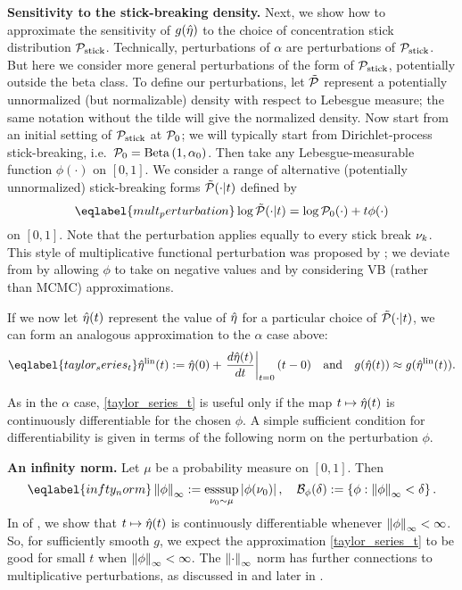 \noindent \textbf{Sensitivity to the stick-breaking density.} Next, we show how
to approximate the sensitivity of $g(\hat\eta)$ to the choice of concentration
stick distribution $\mathcal{P}_{\mathrm{stick}}$. Technically, perturbations of $\alpha$ are
perturbations of $\mathcal{P}_{\mathrm{stick}}$. But here we consider more general perturbations of
the form of $\mathcal{P}_{\mathrm{stick}}$, potentially outside the beta class. To define our
perturbations, let $\tilde{\mathcal{P}}$ represent a potentially unnormalized (but
normalizable) density with respect to Lebesgue measure; the same notation
without the tilde will give the normalized density. Now start from an initial
setting of $\mathcal{P}_{\mathrm{stick}}$ at $\mathcal{P}_{0}$; we will typically start from Dirichlet-process
stick-breaking, i.e.\ $\mathcal{P}_{0} = \mathrm{Beta}\left(1,\alpha_0\right)$. Then take any
Lebesgue-measurable function $\phi(\cdot)$ on $[0,1]$. We consider a range of
alternative (potentially unnormalized) stick-breaking forms $\tilde{\mathcal{P}}(\cdot \vert
t)$ defined by
%
\begin{equation} \eqlabel{mult_perturbation}
	\log \ptil(\cdot \vert \t) = \log \pbase(\cdot) + \t \phi(\cdot)
\end{equation}
%
on $[0,1]$. Note that the perturbation applies equally to every stick break
$\nu_{k}$. This style of multiplicative functional perturbation was proposed by
\citet{gustafson:1996:local}; we deviate from \citet{gustafson:1996:local} by
allowing $\phi$ to take on negative values and by considering VB (rather than
MCMC) approximations.

If we now let $\hat\eta(t)$ represent the value of $\hat\eta$ for a particular
choice of $\tilde{\mathcal{P}}(\cdot \vert t)$, we can form an analogous approximation to the
$\alpha$ case above:
%
\begin{align} \eqlabel{taylor_series_t}
%
\etalin(\t) :=
    \etaopt(0) +
    \fracat{d\etaopt(t)}{dt}{\t=0} (\t - 0)
\mathand
g(\etaopt(\t)) \approx g(\etalin(\t)).
%
\end{align}

As in the $\alpha$ case, \eqref{taylor_series_t} is useful only if the map $t
\mapsto \hat\eta(t)$ is continuously differentiable for the chosen $\phi$. A
simple sufficient condition for differentiability is given in terms of the
following norm on the perturbation $\phi$.

\noindent \textbf{An infinity norm.}
Let $\mu$ be a probability measure on $[0,1]$. Then
\begin{equation} \eqlabel{infty_norm}
	\norminf{\phi} := \esssup_{\nu_0 \sim \mu} \abs{\phi(\nu_0)},
	\quad \ball_\phi(\delta) := \left\{ \phi: \norminf{\phi} <
\delta \right\}.
\end{equation}
%
In  of , we show that
$t \mapsto \hat\eta(t)$ is continuously differentiable whenever $\left\Vert\phi\right\Vert_{\infty} <
\infty$.  So, for sufficiently smooth $g$, we expect the approximation
\eqref{taylor_series_t} to be good for small $t$ when $\left\Vert\phi\right\Vert_{\infty} < \infty$.
The $\left\Vert\cdot\right\Vert_{\infty}$ norm has further connections to multiplicative
perturbations, as discussed in \citep{gustafson:1996:marginal} and later in
.

